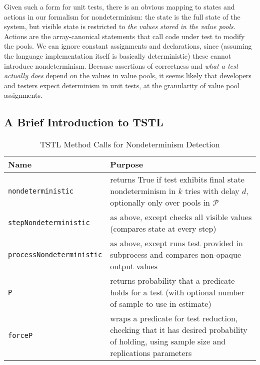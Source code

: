 Given such a form for unit tests, there is an obvious mapping to
states and actions in our formalism for nondeterminism:  the state is
the full state of the system, but visible state is restricted to
\emph{the values stored in the value pools}.  Actions are the
array-canonical statements that call code under test to modify the pools.  We can ignore constant assignments and
declarations, since (assuming the language implementation itself is
basically deterministic) these cannot introduce nondeterminism.
Because assertions of correctness and \emph{what a test actually does}
depend on the values in value pools, it seems likely that developers
and testers expect determinism in unit tests, at the granularity of
value pool assignments.

\subsection{A Brief Introduction to TSTL}

\begin{table*}
\centering
{\scriptsize 

\caption{TSTL Method Calls for Nondeterminism Detection}
\label{tab:methods}
\begin{tabular}{l|l}
Name & Purpose \\
\hline
\hline
{\tt nondeterministic} & returns True if test exhibits final state nondeterminism in $k$
  tries with delay $d$, optionally only over pools in $\mathcal{P}$\\
\hline
{\tt stepNondeterministic} & as above, except checks all visible values
                       (compares state at every step)\\
\hline
{\tt processNondeterministic} & as above, except runs test provided in
                          subprocess and compares non-opaque output
                          values \\
\hline
{\tt P} & returns probability that a predicate holds for a test (with
          optional number of sample to use in estimate) \\
\hline
{\tt forceP} & wraps a predicate for test reduction, checking that it
               has desired probability of holding, using
         sample size and replications parameters \\
\hline
\hline

\end{tabular}
}
\end{table*}

